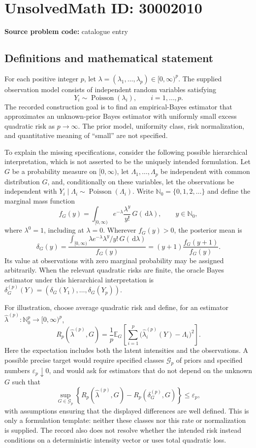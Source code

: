 \documentclass[11pt]{article}
\newcommand{\N}{\mathbb{N}}
\newcommand{\dd}{\,\mathrm{d}}
\begin{document}
\section*{UnsolvedMath ID: 30002010}
\textbf{Source problem code:} catalogue entry
\subsection{Definitions and mathematical statement}
For each positive integer \(p\), let \(\lambda=(\lambda_1,\ldots,\lambda_p)\in[0,\infty)^p\). The supplied observation model consists of independent random variables satisfying
\[
Y_i\sim\operatorname{Poisson}(\lambda_i),\qquad i=1,\ldots,p.
\]
The recorded construction goal is to find an empirical-Bayes estimator that approximates an unknown-prior Bayes estimator with uniformly small excess quadratic risk as \(p\to\infty\). The prior model, uniformity class, risk normalization, and quantitative meaning of ``small'' are not specified.

To explain the missing specifications, consider the following possible hierarchical interpretation, which is not asserted to be the uniquely intended formulation. Let \(G\) be a probability measure on \([0,\infty)\), let \(\Lambda_1,\ldots,\Lambda_p\) be independent with common distribution \(G\), and, conditionally on these variables, let the observations be independent with \(Y_i\mid\Lambda_i\sim\operatorname{Poisson}(\Lambda_i)\). Write \(\N_0=\{0,1,2,\ldots\}\) and define the marginal mass function
\[
f_G(y)=\int_{[0,\infty)}e^{-\lambda}\frac{\lambda^y}{y!}\,G(\dd\lambda),\qquad y\in\N_0,
\]
where \(\lambda^0=1\), including at \(\lambda=0\). Wherever \(f_G(y)>0\), the posterior mean is
\[
\delta_G(y)=\frac{\int_{[0,\infty)}\lambda e^{-\lambda}\lambda^y/y!\,G(\dd\lambda)}{f_G(y)}
=(y+1)\frac{f_G(y+1)}{f_G(y)}.
\]
Its value at observations with zero marginal probability may be assigned arbitrarily. When the relevant quadratic risks are finite, the oracle Bayes estimator under this hierarchical interpretation is \(\delta_G^{(p)}(Y)=(\delta_G(Y_1),\ldots,\delta_G(Y_p))\).

For illustration, choose average quadratic risk and define, for an estimator \(\widehat\lambda^{(p)}:\N_0^p\to[0,\infty)^p\),
\[
R_p(\widehat\lambda^{(p)},G)=\frac1p\mathbb E_G\!\left[\sum_{i=1}^p\bigl(\widehat\lambda_i^{(p)}(Y)-\Lambda_i\bigr)^2\right].
\]
Here the expectation includes both the latent intensities and the observations. A possible precise target would require specified classes \(\mathcal G_p\) of priors and specified numbers \(\varepsilon_p\downarrow0\), and would ask for estimators that do not depend on the unknown \(G\) such that
\[
\sup_{G\in\mathcal G_p}\left\{R_p(\widehat\lambda^{(p)},G)-R_p(\delta_G^{(p)},G)\right\}\leq\varepsilon_p,
\]
with assumptions ensuring that the displayed differences are well defined. This is only a formulation template: neither these classes nor this rate or normalization is supplied. The record also does not resolve whether the intended risk instead conditions on a deterministic intensity vector or uses total quadratic loss.
\end{document}
